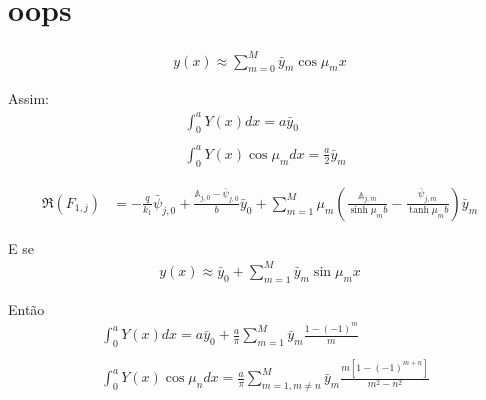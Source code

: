 \section{oops}

\begin{align}
y(x) \approx \sum_{m=0}^M \bar{y}_m \cos\mu_m x
\end{align}

Assim:
\begin{align}
& \int_0^a Y(x)dx = a \bar{y}_0 \\ \nonumber \\
& \int_0^a Y(x)\cos\mu_m dx = \frac{a}{2}\bar{y}_m
\end{align}

\begin{align}
\Re(F_{1,j})
& =
-\frac{q}{k_1}\bar{\psi}_{j,0} + \frac{\mathbb{A}_{j,0} - \bar{\psi}_{j,0}}{b} \bar{y}_0 + \sum_{m=1}^M \mu_m \left(\frac{\mathbb{A}_{j,m}}{\sinh\mu_m b} - \frac{\bar{\psi}_{j, m}}{\tanh\mu_m b}\right)\bar{y}_m
\end{align}

E se
\begin{align}
y(x) \approx \bar{y}_0 + \sum_{m=1}^M \bar{y}_m \sin\mu_m x
\end{align}

Então
\begin{align}
& \int_0^a Y(x)dx = a \bar{y}_0 + \frac{a}{\pi}\sum_{m=1}^M \bar{y}_m \frac{1 - (-1)^m}{m} \\ \nonumber \\
& \int_0^a Y(x)\cos\mu_n dx =\frac{a}{\pi}\sum_{m=1,m\ne n}^M \bar{y}_m \frac{m[1 - (-1)^{m+n}]}{m^2 - n^2}
\end{align}